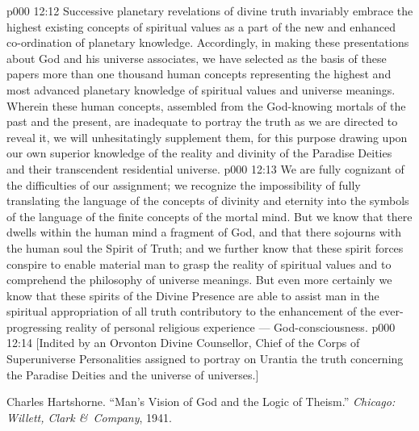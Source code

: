 \vs p000 12:12 Successive planetary revelations of divine truth invariably embrace the highest existing concepts of spiritual values as a part of the new and enhanced co\hyp{}ordination of planetary knowledge. Accordingly, in making these presentations about God and his universe associates, we have selected as the basis of these papers more than one thousand human concepts representing the highest and most advanced planetary knowledge of spiritual values and universe meanings. Wherein these human concepts, assembled from the God\hyp{}knowing mortals of the past and the present, are inadequate to portray the truth as we are directed to reveal it, we will unhesitatingly supplement them, for this purpose drawing upon our own superior knowledge of the reality and divinity of the Paradise Deities and their transcendent residential universe.
\vs p000 12:13 We are fully cognizant of the difficulties of our assignment; we recognize the impossibility of fully translating the language of the concepts of divinity and eternity into the symbols of the language of the finite concepts of the mortal mind. But we know that there dwells within the human mind a fragment of God, and that there sojourns with the human soul the Spirit of Truth; and we further know that these spirit forces conspire to enable material man to grasp the reality of spiritual values and to comprehend the philosophy of universe meanings. But even more certainly we know that these spirits of the Divine Presence are able to assist man in the spiritual appropriation of all truth contributory to the enhancement of the ever\hyp{}progressing reality of personal religious experience --- God\hyp{}consciousness.
\vsetoff
\vs p000 12:14 [Indited by an Orvonton Divine Counsellor, Chief of the Corps of Superuniverse Personalities assigned to portray on Urantia the truth concerning the Paradise Deities and the universe of universes.]
\quizlink
\begin{thebibliography}{100}
Charles Hartshorne.
{``Man's Vision of God and the Logic of Theism.''}
{\em Chicago: Willett, Clark \&\ Company}, 1941.
\end{thebibliography}
